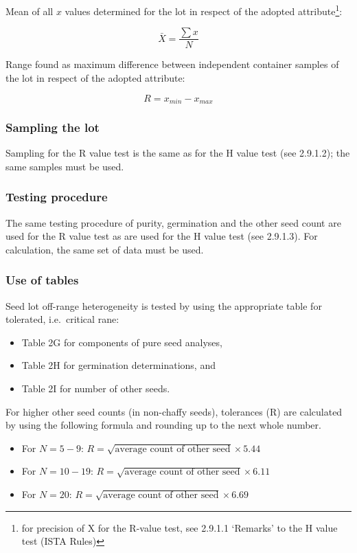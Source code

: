 \documentclass[]{book}
\providecommand{\tightlist}{%
  \setlength{\itemsep}{0pt}\setlength{\parskip}{0pt}}
\begin{document}
Mean of all \(x\) values determined for the lot in respect of the
adopted attribute\footnote{for precision of X for the R-value test, see
  2.9.1.1 `Remarks' to the H value test (ISTA Rules)}:

\[
\bar{X} = \frac{\sum{x}}{N}
\]

Range found as maximum difference between independent container samples
of the lot in respect of the adopted attribute:

\[
R = x_{min} - x_{max}
\]

\subsubsection{Sampling the lot}\label{sampling-the-lot-1}

Sampling for the R value test is the same as for the H value test (see
2.9.1.2); the same samples must be used.

\subsubsection{Testing procedure}\label{testing-procedure-1}

The same testing procedure of purity, germination and the other seed
count are used for the R value test as are used for the H value test
(see 2.9.1.3). For calculation, the same set of data must be used.

\subsubsection{Use of tables}\label{use-of-tables}

Seed lot off-range heterogeneity is tested by using the appropriate
table for tolerated, i.e.~critical rane:

\begin{itemize}
\tightlist
\item
  Table 2G for components of pure seed analyses,
\item
  Table 2H for germination determinations, and
\item
  Table 2I for number of other seeds.
\end{itemize}

For higher other seed counts (in non-chaffy seeds), tolerances (R) are
calculated by using the following formula and rounding up to the next
whole number.

\begin{itemize}
\tightlist
\item
  For \(N = 5-9\):
  \(R = \sqrt{\textrm{average count of other seed}} \times 5.44\)
\item
  For \(N = 10-19\):
  \(R = \sqrt{\textrm{average count of other seed}} \times 6.11\)
\item
  For \(N = 20\):
  \(R = \sqrt{\textrm{average count of other seed}} \times 6.69\)
\end{itemize}
\end{document}
